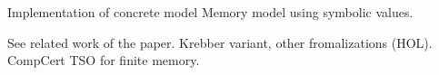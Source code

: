 
Implementation of concrete model
Memory model using symbolic values.

See related work of the paper.
Krebber variant, other fromalizations (HOL).
CompCert TSO for finite memory.
